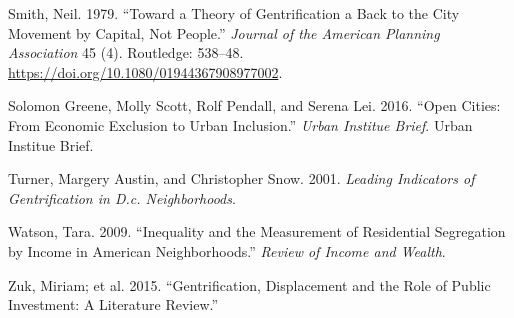 \documentclass[12pt,]{article}
\begin{document}
\leavevmode\hypertarget{ref-Smith1979}{}%
Smith, Neil. 1979. ``Toward a Theory of Gentrification a Back to the
City Movement by Capital, Not People.'' \emph{Journal of the American
Planning Association} 45 (4). Routledge: 538--48.
\url{https://doi.org/10.1080/01944367908977002}.

\leavevmode\hypertarget{ref-urban2016}{}%
Solomon Greene, Molly Scott, Rolf Pendall, and Serena Lei. 2016. ``Open
Cities: From Economic Exclusion to Urban Inclusion.'' \emph{Urban
Institue Brief}. Urban Institue Brief.

\leavevmode\hypertarget{ref-Turner2001}{}%
Turner, Margery Austin, and Christopher Snow. 2001. \emph{Leading
Indicators of Gentrification in D.c. Neighborhoods}.

\leavevmode\hypertarget{ref-Watson2009}{}%
Watson, Tara. 2009. ``Inequality and the Measurement of Residential
Segregation by Income in American Neighborhoods.'' \emph{Review of
Income and Wealth}.

\leavevmode\hypertarget{ref-Zuk2015}{}%
Zuk, Miriam; et al. 2015. ``Gentrification, Displacement and the Role of
Public Investment: A Literature Review.''
\end{document}
